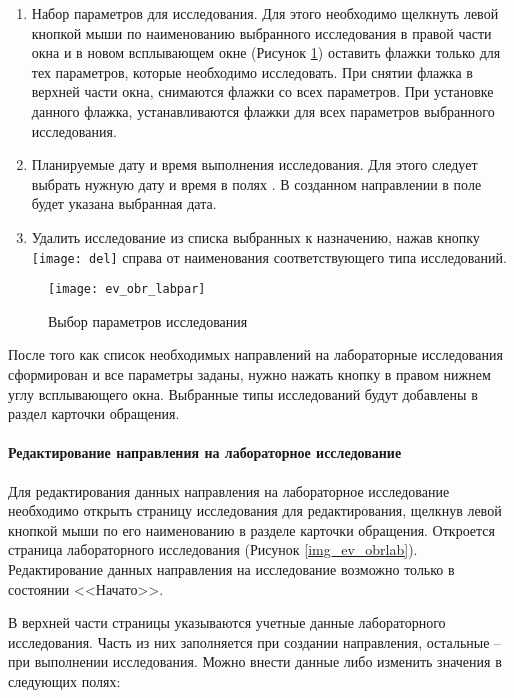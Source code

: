 {\begin{enumerate}
 \item Набор параметров для исследования. Для этого необходимо щелкнуть левой кнопкой мыши по наименованию выбранного исследования в правой части окна и в новом всплывающем окне (Рисунок \ref{img_ev_obr_labpar}) оставить флажки только для тех параметров, которые необходимо исследовать. При снятии флажка  в верхней части окна, снимаются флажки со всех параметров. При установке данного флажка, устанавливаются флажки для всех параметров выбранного исследования.
 \item Планируемые дату и время выполнения исследования. Для этого следует выбрать нужную дату и время в полях . В созданном направлении в поле  будет указана выбранная дата. 
 \item Удалить исследование из списка выбранных к назначению, нажав кнопку \texttt{[image: del]} справа от наименования соответствующего типа исследований.
\end{enumerate}

 \begin{figure}[ht]\centering
 	\texttt{[image: ev\_obr\_labpar]}
 	\caption{Выбор параметров исследования}
 	\label{img_ev_obr_labpar}
 \end{figure}
 
После того как список необходимых направлений на лабораторные исследования сформирован и все параметры заданы, нужно нажать кнопку  в правом нижнем углу всплывающего окна. Выбранные типы исследований будут добавлены в раздел  карточки обращения.

\paragraph{Редактирование направления на лабораторное исследование}

Для редактирования данных направления на лабораторное исследование необходимо открыть страницу исследования для редактирования, щелкнув левой кнопкой мыши по его наименованию в разделе  карточки обращения. Откроется страница лабораторного исследования (Рисунок \ref{img_ev_obrlab}). Редактирование данных направления на исследование возможно только в состоянии <<Начато>>.

В верхней части страницы указываются учетные данные лабораторного исследования. Часть из них заполняется при создании направления, остальные -- при выполнении исследования. Можно внести данные либо изменить значения в следующих полях:

}

